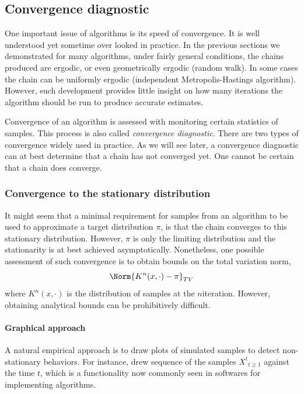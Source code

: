 \subsection{Convergence diagnostic}
\label{sub:Convergence diagnostic}

One important issue of \mcmc algorithms is its speed of convergence. It is
well understood yet sometime over looked in practice. In the previous sections
we demonstrated for many algorithms, under fairly general conditions, the
chains produced are ergodic, or even geometrically ergodic (random walk). In
some cases the chain can be uniformly ergodic (independent Metropolis-Hastings
algorithm). However, such development provides little insight on how many
iterations the algorithm should be run to produce accurate estimates.

Convergence of an \mcmc algorithm is assessed with monitoring certain
statistics of samples. This process is also called \emph{convergence
  diagnostic}. There are two types of convergence
\cite[][chap.~12]{Robert:2004tn} widely used in practice. As we will see
later, a convergence diagnostic can at best determine that a chain has not
converged yet. One cannot be certain that a chain does converge.

\subsubsection{Convergence to the stationary distribution}
\label{ssub:Convergence to the stationary distribution}

It might seem that a minimal requirement for samples from an \mcmc algorithm
to be used to approximate a target distribution $\pi$, is that the chain
converges to this stationary distribution. However, $\pi$ is only the limiting
distribution and the stationarity is at best achieved asymptotically.
Nonetheless, one possible assessment of such convergence is to obtain bounds
on the total variation norm,
\begin{equation*}
  \Norm{K^n(x,\cdot)-\pi}_{TV}
\end{equation*}
where $K^n(x,\cdot)$ is the distribution of samples at the $n$\xth iteration.
However, obtaining analytical bounds can be prohibitively difficult.

\paragraph{Graphical approach}

A natural empirical approach is to draw plots of simulated samples to detect
non-stationary behaviors. For instance, \cite{Gelfand:1990it} drew sequence of
the samples ${X^t}_{t\ge1}$ against the time $t$, which is a functionality now
commonly seen in softwares for implementing \mcmc algorithms.

